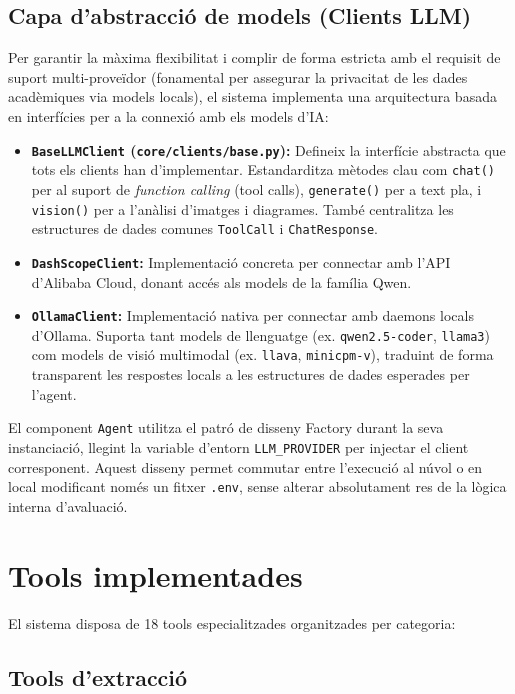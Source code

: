 \documentclass[12pt,a4paper,twoside]{report}
\begin{document}
\subsection{Capa d'abstracci\'o de models (Clients LLM)}
\label{subsec:clients-llm}
Per garantir la m\`axima flexibilitat i complir de forma estricta amb el requisit de suport multi-prove\"idor (fonamental per assegurar la privacitat de les dades acad\`emiques via models locals), el sistema implementa una arquitectura basada en interf\'icies per a la connexi\'o amb els models d'IA:
\begin{itemize}
    \item \textbf{\texttt{BaseLLMClient} (\texttt{core/clients/base.py}):} Defineix la interf\'icie abstracta que tots els clients han d'implementar. Estandarditza m\`etodes clau com \texttt{chat()} per al suport de \textit{function calling} (tool calls), \texttt{generate()} per a text pla, i \texttt{vision()} per a l'an\`alisi d'imatges i diagrames. Tamb\'e centralitza les estructures de dades comunes \texttt{ToolCall} i \texttt{ChatResponse}.
    \item \textbf{\texttt{DashScopeClient}:} Implementaci\'o concreta per connectar amb l'API d'Alibaba Cloud, donant acc\'es als models de la fam\'ilia Qwen.
    \item \textbf{\texttt{OllamaClient}:} Implementaci\'o nativa per connectar amb daemons locals d'Ollama. Suporta tant models de llenguatge (ex. \texttt{qwen2.5-coder}, \texttt{llama3}) com models de visi\'o multimodal (ex. \texttt{llava}, \texttt{minicpm-v}), traduint de forma transparent les respostes locals a les estructures de dades esperades per l'agent.
\end{itemize}
El component \texttt{Agent} utilitza el patr\'o de disseny Factory durant la seva instanciació, llegint la variable d'entorn \texttt{LLM\_PROVIDER} per injectar el client corresponent. Aquest disseny permet commutar entre l'execuci\'o al n\'uvol o en local modificant nom\'es un fitxer \texttt{.env}, sense alterar absolutament res de la l\`ogica interna d'avaluaci\'o.

\section{Tools implementades}
\label{sec:tools}

El sistema disposa de 18 tools especialitzades organitzades per categoria:

\subsection{Tools d'extracci\'o}
\end{document}
